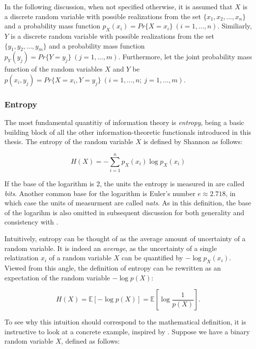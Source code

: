 \documentclass[12pt]{article}
\begin{document}
In the following discussion, when not specified otherwise, it is assumed that $X$ is a discrete random variable with possible realizations from the set $\{x_1, x_2, ..., x_n\}$ and a probability mass function $p_X(x_i) = Pr\{X = x_i\} \ (i = 1, ..., n)$. Similiarly, $Y$ is a discrete random variable with possible realizations from the set $\{y_1, y_2, ..., y_m\}$ and a probability mass function $p_Y(y_j) = Pr\{Y = y_j\} \ (j = 1, ..., m)$. Furthermore, let the joint probability mass function of the random variables $X$ and $Y$ be $p(x_i, y_j) = Pr\{X = x_i, Y = y_j\} \ (i = 1, ..., n; \ j = 1, ..., m)$. 

\subsubsection{Entropy}

The most fundamental quantitiy of information theory is \textit{entropy}, being a basic building block of all the other information-theoretic functionals introduced in this thesis. The entropy of the random variable $X$ is defined by Shannon \cite{shannon} as follows: 

\begin{equation}
H(X) = -\sum_{i=1}^{n} p_X(x_i) \log p_X(x_i)
\label{eq:entropy}
\end{equation}

If the base of the logarithm is 2, the units the entropy is measured in are called \textit{bits}. Another common base for the logarithm is Euler's number $e \approx 2.718$, in which case the units of measurment are called \textit{nats}. As in this definition, the base of the logarihm is also omitted in subsequent discussion for both generality and consistency with \cite{cover-thomas}.

Intuitively, entropy can be thought of as the average amount of uncertainty of a random variable. It is indeed an \textit{average}, as the uncertainty of a single relatization $x_i$ of a random variable $X$ can be quantified by $-\log p_X(x_i)$. Viewed from this angle, the definition of entropy can be rewritten as an expectation of the random variable $-\log p(X)$: 

$$H(X) = \mathbb{E} \left[ - \log p(X) \right] = \mathbb{E} \left[ \log \frac{1}{p(X)} \right].$$

To see why this intuition should correspond to the mathematical definition, it is instructive to look at a concrete example, inspired by \cite{cover-thomas}. Suppose we have a binary random variable $X$, defined as follows: 
\end{document}
